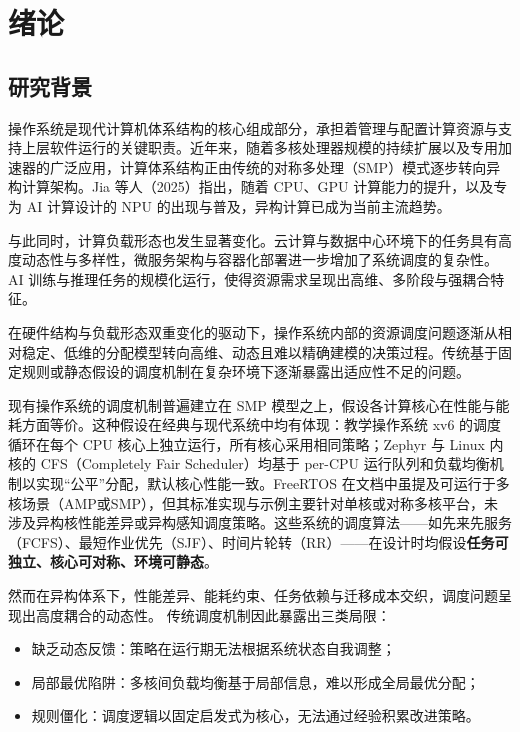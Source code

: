 \section{绪论}
\subsection{研究背景}
操作系统是现代计算机体系结构的核心组成部分，承担着管理与配置计算资源与支持上层软件运行的关键职责。近年来，随着多核处理器规模的持续扩展以及专用加速器的广泛应用，计算体系结构正由传统的对称多处理（SMP）模式逐步转向异构计算架构。Jia 等人（2025）指出，随着 CPU、GPU 计算能力的提升，以及专为 AI 计算设计的 NPU 的出现与普及，异构计算已成为当前主流趋势\cite{jia2024agentcentricoperating}。

与此同时，计算负载形态也发生显著变化。云计算与数据中心环境下的任务具有高度动态性与多样性，微服务架构与容器化部署进一步增加了系统调度的复杂性。AI 训练与推理任务的规模化运行，使得资源需求呈现出高维、多阶段与强耦合特征。

在硬件结构与负载形态双重变化的驱动下，操作系统内部的资源调度问题逐渐从相对稳定、低维的分配模型转向高维、动态且难以精确建模的决策过程。传统基于固定规则或静态假设的调度机制在复杂环境下逐渐暴露出适应性不足的问题。

现有操作系统的调度机制普遍建立在 SMP 模型之上，假设各计算核心在性能与能耗方面等价。这种假设在经典与现代系统中均有体现：教学操作系统 xv6 的调度循环在每个 CPU 核心上独立运行，所有核心采用相同策略\cite{cox2011xv6}；Zephyr 与 Linux 内核的 CFS（Completely Fair Scheduler）均基于 per-CPU 运行队列和负载均衡机制以实现“公平”分配，默认核心性能一致。FreeRTOS 在文档中虽提及可运行于多核场景（AMP或SMP），但其标准实现与示例主要针对单核或对称多核平台，未涉及异构核性能差异或异构感知调度策略\cite{barry2008freertos}。这些系统的调度算法——如先来先服务（FCFS）、最短作业优先（SJF）、时间片轮转（RR）——在设计时均假设\textbf{任务可独立、核心可对称、环境可静态}。

然而在异构体系下，性能差异、能耗约束、任务依赖与迁移成本交织，调度问题呈现出高度耦合的动态性。
传统调度机制因此暴露出三类局限：
\begin{itemize}
    \item 缺乏动态反馈：策略在运行期无法根据系统状态自我调整；
    \item 局部最优陷阱：多核间负载均衡基于局部信息，难以形成全局最优分配；
    \item 规则僵化：调度逻辑以固定启发式为核心，无法通过经验积累改进策略。
\end{itemize}

